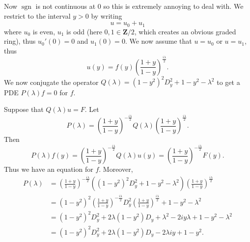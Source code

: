 \documentclass[reqno,12pt,letterpaper]{amsart}
\newcommand{\ZZ}{\mathbf{Z}}
\DeclareMathOperator{\sgn}{sgn}
\theoremstyle{definition}
\begin{document}
Now $\sgn$ is not continuous at $0$ so this is extremely annoying to deal with. We restrict to the interval $y > 0$ by writing
$$u = u_0 + u_1$$
where $u_0$ is even, $u_1$ is odd (here $0,1 \in \ZZ/2$, which creates an obvious graded ring), thus $u_0'(0) = 0$ and $u_1(0) = 0$. We now assume that $u = u_0$ or $u = u_1$, thus
$$u(y) = f(y)\left(\frac{1+y}{1-y}\right)^{\frac{i\lambda}{2}}.$$
We now conjugate the operator $Q(\lambda) = (1 - y^2)^2D_y^2 + 1 - y^2 - \lambda^2$ to get a PDE $P(\lambda)f = 0$ for $f$.

Suppose that $Q(\lambda)u = F$. Let
$$P(\lambda) = \left(\frac{1+y}{1-y}\right)^{-\frac{i\lambda}{2}} Q(\lambda) \left(\frac{1+y}{1-y}\right)^{\frac{i\lambda}{2}}.$$
Then
$$P(\lambda)f(y) = \left(\frac{1+y}{1-y}\right)^{-\frac{i\lambda}{2}} Q(\lambda)u(y) = \left(\frac{1+y}{1-y}\right)^{-\frac{i\lambda}{2}}F(y).$$
Thus we have an equation for $f$.
Moreover,
\begin{align*}
P(\lambda) &= \left(\frac{1+y}{1-y}\right)^{-\frac{i\lambda}{2}}\left((1 - y^2)^2 D_y^2 + 1 - y^2 - \lambda^2\right)\left(\frac{1+y}{1-y}\right)^{\frac{i\lambda}{2}}\\
&= (1 - y^2)^2 \left(\frac{1+y}{1-y}\right)^{-\frac{i\lambda}{2}} D_y^2 \left(\frac{1+y}{1-y}\right)^{\frac{i\lambda}{2}} + 1 - y^2 - \lambda^2\\
&= (1 - y^2)^2 D_y^2 + 2\lambda(1 - y^2)D_y + \lambda^2 - 2iy\lambda + 1 - y^2 - \lambda^2\\
&= (1 - y^2)^2 D_y^2 + 2\lambda(1 - y^2)D_y - 2\lambda iy + 1 - y^2.
\end{align*}
\end{document}

